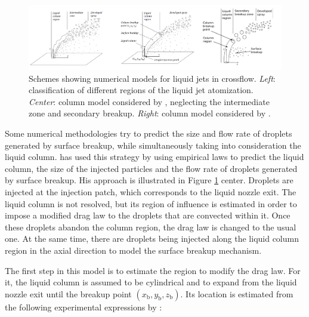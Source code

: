 \begin{figure}[ht]
    \centering
    \includegraphics[width=1.0\textwidth]{./part1_numerical_approaches/figures_ch3/jaegle_senoner_modeling_strategies}
       \centering
    \caption[Schemes showing numerical models for liquid jets in crossflow]{Schemes showing numerical models for liquid jets in crossflow. \textsl{Left}: classification of different regions of the liquid jet atomization. \textsl{Center}:  column model considered by , neglecting the intermediate zone and secondary breakup. \textsl{Right}: column model considered by  .}
    \label{fig:jaegle_senoner_modeling_strategies}
\end{figure}


Some numerical methodologies try to predict the size and flow rate of droplets generated by surface breakup, while simultaneously taking into consideration the liquid column.  has used this strategy by using empirical laws to predict the liquid column, the size of the injected particles and the flow rate of droplets generated by surface breakup. His approach is illustrated in Figure \ref{fig:jaegle_senoner_modeling_strategies} center. Droplets are injected at the injection patch, which corresponds to the liquid nozzle exit. The liquid column is not resolved, but its region of influence is estimated in order to impose a modified drag law to the droplets that are convected within it. Once these droplets abandon the column region, the drag law is changed to the usual one. At the same time, there are droplets being injected along the liquid column region in the axial direction to model the surface breakup mechanism.




The first step in this model is to estimate the region to modify the drag law. For it, the liquid column is assumed to be cylindrical and to expand from the liquid nozzle exit until the breakup point $\left( x_\mathrm{b}, y_\mathrm{b}, z_\mathrm{b} \right)$. Its location is estimated from the following experimental expressions by :

